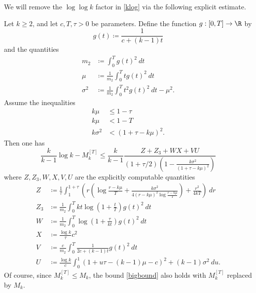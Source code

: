 We will remove the $\log\log k$ factor in \eqref{klog} via the following explicit estimate.

\begin{theorem}  Let $k \geq 2$, and let $c,T,\tau > 0$ be parameters.  Define the function $g: [0,T] \to \R$ by
\begin{equation}\label{g-def}
 g(t) \coloneqq \frac{1}{c + (k-1) t}
\end{equation}
and the quantities
\begin{align}
m_2 &\coloneqq \int_0^T g(t)^2\ dt \label{m2-def}\\
\mu &\coloneqq \frac{1}{m_2} \int_0^T t g(t)^2\ dt \label{mu-def}\\
\sigma^2 &\coloneqq \frac{1}{m_2} \int_0^T t^2 g(t)^2\ dt - \mu^2.\label{sigma-def}
\end{align}
Assume the inequalities
\begin{align}
k\mu &\leq 1-\tau \label{tau-bound}\\
k\mu &< 1-T \label{T-bound}\\
k\sigma^2 &< (1+\tau-k\mu)^2. \label{ksb}
\end{align}
Then one has
\begin{equation}\label{bigbound}
 \frac{k}{k-1} \log k - M_k^{[T]} \leq \frac{k}{k-1} \frac{Z + Z_3 + WX + VU}{(1+\tau/2) (1 - \frac{k\sigma^2}{(1+\tau-k\mu)^2})}
\end{equation}
where $Z, Z_3, W, X, V, U$ are the explicitly computable quantities
\begin{align}
Z &\coloneqq \frac{1}{\tau} \int_1^{1+\tau}\left( r\left(\log\frac{r-k\mu}{T} + \frac{k\sigma^2}{4(r-k\mu)^2 \log \frac{r-k\mu}{T}} \right) + \frac{r^2}{4kT}\right)\ dr\label{z-def}\\
Z_3 &\coloneqq \frac{1}{m_2} \int_0^T kt \log(1+\frac{t}{T}) g(t)^2\ dt \label{z3-def}\\
W &\coloneqq \frac{1}{m_2} \int_0^T \log(1+\frac{\tau}{kt}) g(t)^2\ dt\label{W-def}\\
X &\coloneqq \frac{\log k}{\tau} c^2 \label{X-def}\\
V &\coloneqq \frac{c}{m_2} \int_0^T \frac{1}{2c + (k-1)t} g(t)^2\ dt \label{V-def} \\
U &\coloneqq \frac{\log k}{c} \int_0^1 (1 + u\tau- (k-1)\mu- c)^2 + (k-1) \sigma^2\ du.\label{U-def}
\end{align}
Of course, since $M_k^{[T]} \leq M_k$, the bound \eqref{bigbound} also holds with $M_k^{[T]}$ replaced by $M_k$.
\end{theorem}

